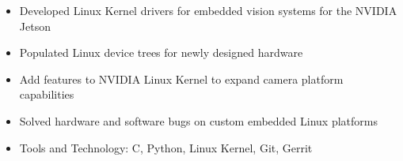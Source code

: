 \begin{itemize}
    \setlength\itemsep{0pt}
    \setlength{\parskip}{0pt}
    \item Developed Linux Kernel drivers for embedded vision systems for the NVIDIA Jetson
    \item Populated Linux device trees for newly designed hardware
    \item Add features to NVIDIA Linux Kernel to expand camera platform capabilities
    \item Solved hardware and software bugs on custom embedded Linux platforms
    \item Tools and Technology: C, Python, Linux Kernel, Git, Gerrit
\end{itemize}
